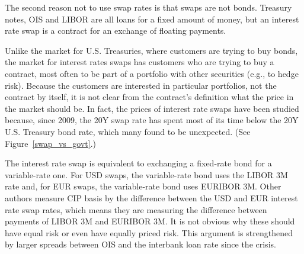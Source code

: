 The second reason not to use swap rates is that swaps are not bonds.  Treasury notes, OIS and LIBOR are all loans for a fixed amount of money, but an interest rate swap is a contract for an exchange of floating payments.  

Unlike the market for U.S. Treasuries, where customers are trying to buy bonds, the market for interest rates swaps has customers who are trying to buy a contract, most often to be part of a portfolio with other securities (e.g., to hedge risk).  Because the customers are interested in particular portfolios, not the contract by itself, it is not clear from the contract's definition what the price in the market should be.  In fact, the prices of interest rate swaps have been studied\cite{Jermann2017} because, since 2009, the 20Y swap rate has spent most of its time below the 20Y U.S. Treasury bond rate, which many found to be unexpected.  (See Figure~\ref{swap_vs_govt}.)


The interest rate swap is equivalent to exchanging a fixed-rate bond for a variable-rate one.  For USD swaps, the variable-rate bond uses the LIBOR 3M rate and, for EUR swaps, the variable-rate bond uses EURIBOR 3M.  Other authors measure CIP basis by the difference between the USD and EUR interest rate swap rates, which means they are measuring the difference between payments of LIBOR 3M and EURIBOR 3M.  It is not obvious why these should have equal risk or even have equally priced risk.  This argument is strengthened by larger spreads between OIS and the interbank loan rate since the crisis.\cite{Du2017,Borio2016}




